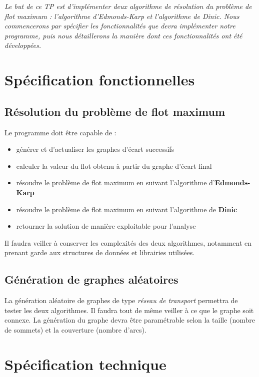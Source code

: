 \textit{Le but de ce TP est d'implémenter deux algorithme de résolution du problème de flot maximum : l'algorithme d'Edmonds-Karp et l'algorithme de Dinic. Nous commencerons par spécifier les fonctionnalités que devra implémenter notre programme, puis nous détaillerons la manière dont ces fonctionnalités ont été développées.}

\section{Spécification fonctionnelles}

\subsection{Résolution du problème de flot maximum}

Le programme doit être capable de :
\begin{itemize}
\item générer et d'actualiser les graphes d'écart successifs
\item calculer la valeur du flot obtenu à partir du graphe d'écart final
\item résoudre le problème de flot maximum en suivant l'algorithme d'\textbf{Edmonds-Karp}
\item résoudre le problème de flot maximum en suivant l'algorithme de \textbf{Dinic}
\item retourner la solution de manière exploitable pour l'analyse
\end{itemize}

Il faudra veiller à conserver les complexités des deux algorithmes, notamment en prenant garde aux structures de données et librairies utilisées.

\subsection{Génération de graphes aléatoires}

La génération aléatoire de graphes de type \emph{réseau de transport} permettra de tester les deux algorithmes. Il faudra tout de même veiller à ce que le graphe soit connexe. La génération du graphe devra être paramétrable selon la taille (nombre de sommets) et la couverture (nombre d'arcs).

\section{Spécification technique}

